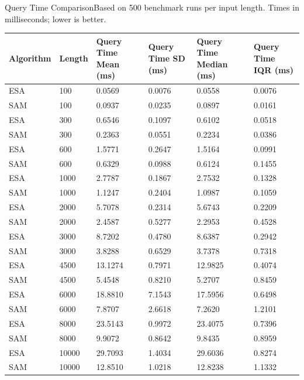 \begin{benchmarktable}{Query Time Comparison}{Based on 500 benchmark runs per input length. Times in milliseconds; lower is better.}
\begin{tabularx}{\textwidth}{|X|X|X|X|X|X|}
\toprule
Algorithm & Length & Query Time Mean (ms) & Query Time SD (ms) & Query Time Median (ms) & Query Time IQR (ms) \\
\midrule
ESA & 100 & 0.0569 & 0.0076 & 0.0558 & 0.0076 \\
SAM & 100 & 0.0937 & 0.0235 & 0.0897 & 0.0161 \\
\hline
ESA & 300 & 0.6546 & 0.1097 & 0.6102 & 0.0518 \\
SAM & 300 & 0.2363 & 0.0551 & 0.2234 & 0.0386 \\
\hline
ESA & 600 & 1.5771 & 0.2647 & 1.5164 & 0.0991 \\
SAM & 600 & 0.6329 & 0.0988 & 0.6124 & 0.1455 \\
\hline
ESA & 1000 & 2.7787 & 0.1867 & 2.7532 & 0.1328 \\
SAM & 1000 & 1.1247 & 0.2404 & 1.0987 & 0.1059 \\
\hline
ESA & 2000 & 5.7078 & 0.2314 & 5.6743 & 0.2209 \\
SAM & 2000 & 2.4587 & 0.5277 & 2.2953 & 0.4528 \\
\hline
ESA & 3000 & 8.7202 & 0.4780 & 8.6387 & 0.2942 \\
SAM & 3000 & 3.8288 & 0.6529 & 3.7378 & 0.7318 \\
\hline
ESA & 4500 & 13.1274 & 0.7971 & 12.9825 & 0.4074 \\
SAM & 4500 & 5.4548 & 0.8210 & 5.2707 & 0.8459 \\
\hline
ESA & 6000 & 18.8810 & 7.1543 & 17.5956 & 0.6498 \\
SAM & 6000 & 7.8707 & 2.6618 & 7.2620 & 1.2101 \\
\hline
ESA & 8000 & 23.5143 & 0.9972 & 23.4075 & 0.7396 \\
SAM & 8000 & 9.9072 & 0.8642 & 9.8435 & 0.8959 \\
\hline
ESA & 10000 & 29.7093 & 1.4034 & 29.6036 & 0.8274 \\
SAM & 10000 & 12.8510 & 1.0218 & 12.8238 & 1.1332 \\
\bottomrule
\end{tabularx}
\end{benchmarktable}

